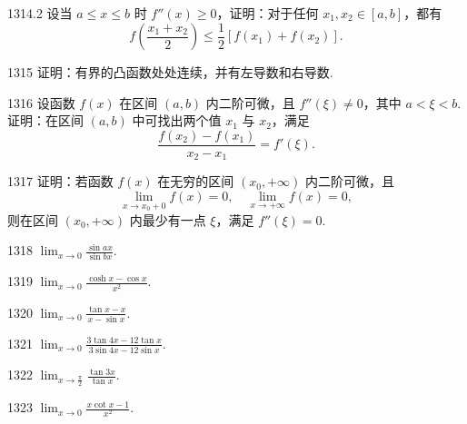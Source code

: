 \begin{prob}[M]{1314.2}
设当 $a \leqslant x \leqslant b$ 时 $f''(x) \geqslant 0$，证明：对于任何 $x_1, x_2 \in [a, b]$，都有
\[
f\left(\frac{x_1 + x_2}{2}\right) \leqslant \frac{1}{2}[f(x_1) + f(x_2)].
\]
\end{prob}

\begin{prob}[M]{1315}
证明：有界的凸函数处处连续，并有左导数和右导数.
\end{prob}

\begin{prob}[M]{1316}
设函数 $f(x)$ 在区间 $(a, b)$ 内二阶可微，且 $f''(\xi) \neq 0$，其中 $a < \xi < b$. 证明：在区间 $(a, b)$ 中可找出两个值 $x_1$ 与 $x_2$，满足
\[
\frac{f(x_2) - f(x_1)}{x_2 - x_1} = f'(\xi).
\]
\end{prob}

\begin{prob}[M]{1317}
证明：若函数 $f(x)$ 在无穷的区间 $(x_0, +\infty)$ 内二阶可微，且
\[
\lim_{x \to x_0 + 0} f(x) = 0, \quad \lim_{x \to +\infty} f(x) = 0,
\]
则在区间 $(x_0, +\infty)$ 内最少有一点 $\xi$，满足 $f''(\xi) = 0$.
\end{prob}



\begin{prob}[S]{1318}
$\lim_{x \to 0} \frac{\sin ax}{\sin bx}$.
\end{prob}

\begin{prob}[S]{1319}
$\lim_{x \to 0} \frac{\cosh x - \cos x}{x^2}$.
\end{prob}

\begin{prob}[S]{1320}
$\lim_{x \to 0} \frac{\tan x - x}{x - \sin x}$.
\end{prob}

\begin{prob}[S]{1321}
$\lim_{x \to 0} \frac{3\tan 4x - 12\tan x}{3\sin 4x - 12\sin x}$.
\end{prob}

\begin{prob}[S]{1322}
$\lim_{x \to \frac{\pi}{2}} \frac{\tan 3x}{\tan x}$.
\end{prob}

\begin{prob}[S]{1323}
$\lim_{x \to 0} \frac{x\cot x - 1}{x^2}$.
\end{prob}

